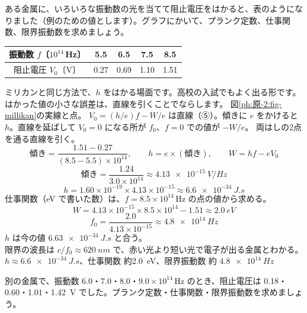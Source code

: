 \label{ph:原-2:ex5}
\begin{phreidai}
ある金属に、いろいろな振動数の光を当てて阻止電圧をはかると、表のようになりました（例のための値とします）。グラフにかいて、プランク定数、仕事関数、限界振動数を求めましょう。
\begin{center}\small
\begin{tabular}{c|cccc}
振動数 $f$〔$10^{14}$\,Hz〕 & 5.5 & 6.5 & 7.5 & 8.5 \\ \hline
阻止電圧 $V_0$〔V〕 & 0.27 & 0.69 & 1.10 & 1.51
\end{tabular}
\end{center}
\phbamen
ミリカンと同じ方法で、$h$ をはかる場面です。高校の入試でもよく出る形です。
\phmushi
はかった値の小さな誤差は、直線を引くことでならします。
\phzu
図\ref{ph:原-2:fig-millikan}の実線と点。
\phriyu
$V_0=(h/e)f-W/e$ は直線（⑤）。傾きに $e$ をかけると $h$。直線を延ばして $V_0=0$ になる所が $f_0$、$f=0$ での値が $-W/e$。
\phtateru
両はしの2点を通る直線を引く。
\[ \text{傾き}=\frac{1.51-0.27}{(8.5-5.5)\times10^{14}},\qquad h=e\times(\text{傾き}),\qquad W=hf-eV_0 \]
\phtoku
\[ \text{傾き}=\frac{1.24}{3.0\times10^{14}}\approx\qty{4.13e-15}{V/Hz} \]
\[ h=1.60\times10^{-19}\times4.13\times10^{-15}\approx\qty{6.6e-34}{J.s} \]
仕事関数（eV で書いた数）は、$f=8.5\times10^{14}$\,Hz の点の値から求める。
\[ W=4.13\times10^{-15}\times8.5\times10^{14}-1.51\approx\qty{2.0}{eV} \]
\[ f_0=\frac{2.0}{4.13\times10^{-15}}\approx\qty{4.8e14}{Hz} \]
\phtashikame
$h$ は今の値 $\qty{6.63e-34}{J.s}$ と合う。\\
限界の波長は $c/f_0\approx\qty{620}{nm}$ で、赤い光より短い光で電子が出る金属とわかる。
\kotae $h\approx\qty{6.6e-34}{J.s}$、仕事関数 約\qty{2.0}{eV}、限界振動数 約 $\qty{4.8e14}{Hz}$
\end{phreidai}
\begin{jibun}
別の金属で、振動数 6.0・7.0・8.0・$9.0\times10^{14}$\,Hz のとき、阻止電圧は 0.18・0.60・1.01・\qty{1.42}{V} でした。プランク定数・仕事関数・限界振動数を求めましょう。
\end{jibun}

